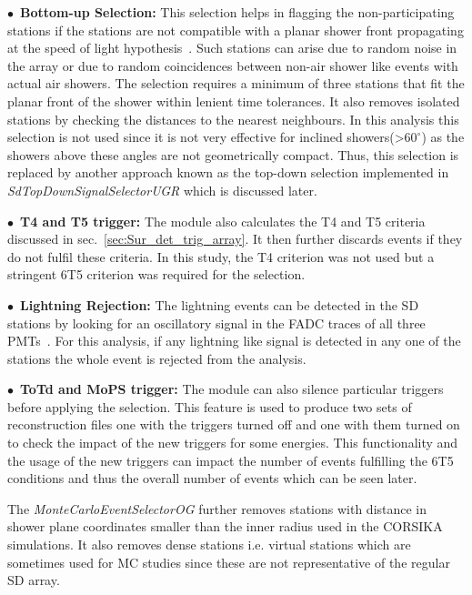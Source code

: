 \begin{description}
  \item $\bullet$~\textbf{Bottom-up Selection:} This selection helps in flagging the non-participating stations if the stations are not compatible with a planar shower front propagating at the speed of light hypothesis~\cite{gap_bottom_up}. Such stations can arise due to random noise in the array or due to random coincidences between non-air shower like events with actual air showers. The selection requires a minimum of three stations that fit the planar front of the shower within lenient time tolerances. It also removes isolated stations by checking the distances to the nearest neighbours. In this analysis this selection is not used since it is not very effective for inclined showers(>$60^{\circ}$) as the showers above these angles are not geometrically compact. Thus, this selection is replaced by another approach known as the top-down selection implemented in \textit{SdTopDownSignalSelectorUGR} which is discussed later. 
  \item $\bullet$~\textbf{T4 and T5 trigger:} The module also calculates the T4 and T5 criteria discussed in sec.~\ref{sec:Sur_det_trig_array}. It then further discards events if they do not fulfil these criteria. In this study, the T4 criterion was not used but a stringent 6T5 criterion was required for the selection. 
  \item $\bullet$~\textbf{Lightning Rejection:} The lightning events can be detected in the SD stations by looking for an oscillatory signal in the FADC traces of all three PMTs~\cite{2017AGUFMAE31A..06C}. For this analysis, if any lightning like signal is detected in any one of the stations the whole event is rejected from the analysis. 
  \item $\bullet$~\textbf{ToTd and MoPS trigger:} The module can also silence particular triggers before applying the selection. This feature is used to produce two sets of reconstruction files one with the triggers turned off and one with them turned on to check the impact of the new triggers for some energies. This functionality and the usage of the new triggers can impact the number of events fulfilling the 6T5 conditions and thus the overall number of events which can be seen later.    
\end{description}

The \textit{MonteCarloEventSelectorOG} further removes stations with distance in shower plane coordinates smaller than the inner radius used in the CORSIKA simulations. It also removes dense stations i.e. virtual stations which are sometimes used for MC studies since these are not representative of the regular SD array. 

